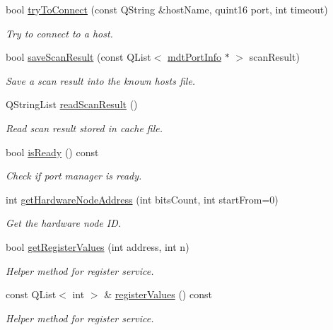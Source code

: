 \begin{DoxyCompactItemize}
bool \hyperlink{classmdt_modbus_tcp_port_manager_ab04f69b660487a7c59d309df7a8f5baa}{tryToConnect} (const QString \&hostName, quint16 port, int timeout)
\begin{DoxyCompactList}\small\item\em Try to connect to a host. \end{DoxyCompactList}\item 
bool \hyperlink{classmdt_modbus_tcp_port_manager_a3a1f5a54c93fa90ba83dea8785407da3}{saveScanResult} (const QList$<$ \hyperlink{classmdt_port_info}{mdtPortInfo} $\ast$ $>$ scanResult)
\begin{DoxyCompactList}\small\item\em Save a scan result into the known hosts file. \end{DoxyCompactList}\item 
QStringList \hyperlink{classmdt_modbus_tcp_port_manager_ab4d0a994973af6008faf489ca9ddb03d}{readScanResult} ()
\begin{DoxyCompactList}\small\item\em Read scan result stored in cache file. \end{DoxyCompactList}\item 
bool \hyperlink{classmdt_modbus_tcp_port_manager_a5477eb7e8d57c5a42004046b426e39b6}{isReady} () const 
\begin{DoxyCompactList}\small\item\em Check if port manager is ready. \end{DoxyCompactList}\item 
int \hyperlink{classmdt_modbus_tcp_port_manager_a4f52a477c264f809984e25abbc856db8}{getHardwareNodeAddress} (int bitsCount, int startFrom=0)
\begin{DoxyCompactList}\small\item\em Get the hardware node ID. \end{DoxyCompactList}\item 
bool \hyperlink{classmdt_modbus_tcp_port_manager_ab5e780409492b5f56326a870bc4262ec}{getRegisterValues} (int address, int n)
\begin{DoxyCompactList}\small\item\em Helper method for register service. \end{DoxyCompactList}\item 
const QList$<$ int $>$ \& \hyperlink{classmdt_modbus_tcp_port_manager_a99a13b5250a8523aa63869991581e56a}{registerValues} () const 
\begin{DoxyCompactList}\small\item\em Helper method for register service. \end{DoxyCompactList}\item 

\end{DoxyCompactItemize}
